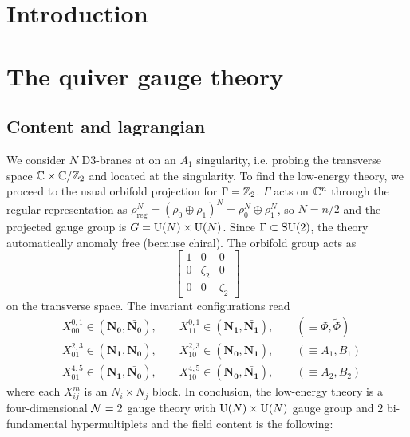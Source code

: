 \section{Introduction}



\section{The quiver gauge theory}

    \subsection{Content and lagrangian}

        We consider $N$ D$3$-branes at on an $A_1$ singularity, i.e. probing the transverse space $\mathbb{C}\times\mathbb{C}/\mathbb{Z}_2$ and located at the singularity. To find the low-energy theory, we proceed to the usual orbifold projection for $\Gamma=\mathbb{Z}_2$. $\Gamma$ acts on $\mathbb{C}^n$ through the regular representation as $\rho^N_{\text{reg}}=(\rho_0\oplus\rho_1)^N=\rho^N_0\oplus\rho^N_1$, so $N=n/2$ and the projected gauge group is $G=\text{U}(N)\times\text{U}(N)$. Since $\Gamma\subset\text{SU}(2)$, the theory automatically anomaly free (because chiral). The orbifold group acts as
        \begin{equation}
            \begin{bmatrix}
                1 & 0 & 0 \\
                0 & \zeta_2 & 0 \\
                0 & 0 & \zeta_2
            \end{bmatrix}
        \end{equation}
        on the transverse space. The invariant configurations read
        \begin{align}
            &X^{0,1}_{00}\in(\boldsymbol{N_0},\bar{\boldsymbol{N_0}}),\qquad X^{0,1}_{11}\in(\boldsymbol{N_1},\bar{\boldsymbol{N_1}}),\qquad (\equiv\Phi,\tilde{\Phi})\\
            &X^{2,3}_{01}\in(\boldsymbol{N_1},\bar{\boldsymbol{N_0}}),\qquad X^{2,3}_{10}\in(\boldsymbol{N_0},\bar{\boldsymbol{N_1}}),\qquad (\equiv A_1,B_1)\\
            &X^{4,5}_{01}\in(\boldsymbol{N_1},\bar{\boldsymbol{N_0}}),\qquad X^{4,5}_{10}\in(\boldsymbol{N_0},\bar{\boldsymbol{N_1}}),\qquad (\equiv A_2,B_2)
        \end{align}
        where each $X^m_{ij}$ is an $N_i\times N_j$ block. In conclusion, the low-energy theory is a four-dimensional $\mathcal{N}=2$ gauge theory with $\text{U}(N)\times\text{U}(N)$ gauge group and $2$ bi-fundamental hypermultiplets and the field content is the following:
